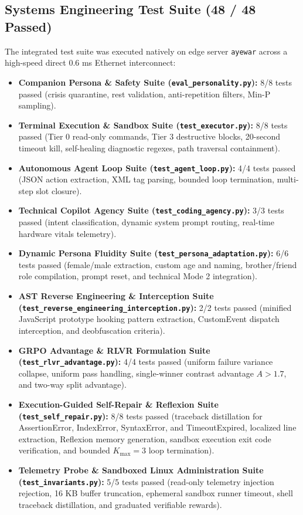 \documentclass[10pt,a4paper]{article}
\begin{document}
\subsection{Systems Engineering Test Suite (48 / 48 Passed)}
The integrated test suite was executed natively on edge server \texttt{ayewar} across a high-speed direct 0.6 ms Ethernet interconnect:
\begin{itemize}
    \item \textbf{Companion Persona \& Safety Suite (\texttt{eval\_personality.py}):} 8/8 tests passed (crisis quarantine, rest validation, anti-repetition filters, Min-P sampling).
    \item \textbf{Terminal Execution \& Sandbox Suite (\texttt{test\_executor.py}):} 8/8 tests passed (Tier 0 read-only commands, Tier 3 destructive blocks, 20-second timeout kill, self-healing diagnostic regexes, path traversal containment).
    \item \textbf{Autonomous Agent Loop Suite (\texttt{test\_agent\_loop.py}):} 4/4 tests passed (JSON action extraction, XML tag parsing, bounded loop termination, multi-step slot closure).
    \item \textbf{Technical Copilot Agency Suite (\texttt{test\_coding\_agency.py}):} 3/3 tests passed (intent classification, dynamic system prompt routing, real-time hardware vitals telemetry).
    \item \textbf{Dynamic Persona Fluidity Suite (\texttt{test\_persona\_adaptation.py}):} 6/6 tests passed (female/male extraction, custom age and naming, brother/friend role compilation, prompt reset, and technical Mode 2 integration).
    \item \textbf{AST Reverse Engineering \& Interception Suite (\texttt{test\_reverse\_engineering\_interception.py}):} 2/2 tests passed (minified JavaScript prototype hooking pattern extraction, CustomEvent dispatch interception, and deobfuscation criteria).
    \item \textbf{GRPO Advantage \& RLVR Formulation Suite (\texttt{test\_rlvr\_advantage.py}):} 4/4 tests passed (uniform failure variance collapse, uniform pass handling, single-winner contrast advantage $A > 1.7$, and two-way split advantage).
    \item \textbf{Execution-Guided Self-Repair \& Reflexion Suite (\texttt{test\_self\_repair.py}):} 8/8 tests passed (traceback distillation for AssertionError, IndexError, SyntaxError, and TimeoutExpired, localized line extraction, Reflexion memory generation, sandbox execution exit code verification, and bounded $K_{\max}=3$ loop termination).
    \item \textbf{Telemetry Probe \& Sandboxed Linux Administration Suite (\texttt{test\_invariants.py}):} 5/5 tests passed (read-only telemetry injection rejection, 16 KB buffer truncation, ephemeral sandbox runner timeout, shell traceback distillation, and graduated verifiable rewards).
\end{itemize}
\end{document}
